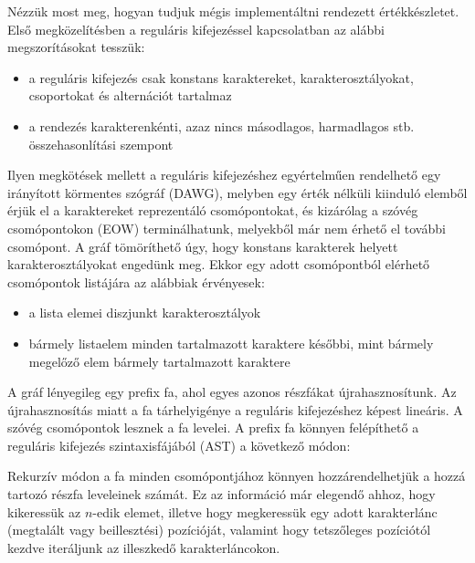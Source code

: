 \documentclass[
    parspace,
    noindent,
    nohyp,
]{elteiktdk}[2023/04/10]
\begin{document}
Nézzük most meg, hogyan tudjuk mégis implementáltni rendezett értékkészletet.
Első megközelítésben a reguláris kifejezéssel kapcsolatban az alábbi megszorításokat tesszük:

\begin{itemize}
    \item a reguláris kifejezés csak konstans karaktereket, karakterosztályokat, csoportokat és alternációt tartalmaz
    \item a rendezés karakterenkénti, azaz nincs másodlagos, harmadlagos stb. összehasonlítási szempont
\end{itemize}

Ilyen megkötések mellett a reguláris kifejezéshez egyértelműen rendelhető egy
irányított körmentes szógráf (DAWG),
melyben egy érték nélküli kiinduló elemből érjük el a karaktereket reprezentáló csomópontokat,
és kizárólag a szóvég csomópontokon (EOW) terminálhatunk,
melyekből már nem érhető el további csomópont.
A gráf tömöríthető úgy, hogy konstans karakterek helyett karakterosztályokat engedünk meg.
Ekkor egy adott csomópontból elérhető csomópontok listájára az alábbiak érvényesek:

\begin{itemize}
    \item a lista elemei diszjunkt karakterosztályok
    \item bármely listaelem minden tartalmazott karaktere későbbi, mint bármely megelőző elem bármely tartalmazott karaktere
\end{itemize}


A gráf lényegileg egy prefix fa, ahol egyes azonos részfákat újrahasznosítunk.
Az újrahasznosítás miatt a fa tárhelyigénye a reguláris kifejezéshez képest lineáris.
A szóvég csomópontok lesznek a fa levelei.
A prefix fa könnyen felépíthető a reguláris kifejezés szintaxisfájából (AST)
a következő módon:


Rekurzív módon a fa minden csomópontjához könnyen hozzárendelhetjük
a hozzá tartozó részfa leveleinek számát.
Ez az információ már elegendő ahhoz, hogy kikeressük az $n$-edik elemet,
illetve hogy megkeressük egy adott karakterlánc (megtalált vagy beillesztési) pozícióját,
valamint hogy tetszőleges pozíciótól kezdve iteráljunk az illeszkedő karakterláncokon.

\end{document}
